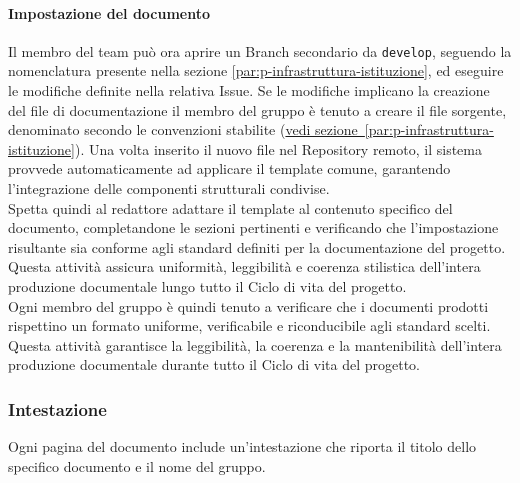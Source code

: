 \documentclass[a4paper,12pt]{article}
\begin{document}
\paragraph{Impostazione del documento}
Il membro del team può ora aprire un Branch secondario da \texttt{develop}, seguendo la nomenclatura presente nella sezione \ref{par:p-infrastruttura-istituzione}, ed eseguire le modifiche definite nella relativa Issue. 
Se le modifiche implicano la creazione del file di documentazione il membro del gruppo è tenuto a creare il file sorgente, denominato secondo le convenzioni stabilite (\hyperref[par:p-infrastruttura-istituzione]{vedi sezione~\ref*{par:p-infrastruttura-istituzione}}). Una volta inserito il nuovo file nel Repository remoto, il sistema provvede automaticamente ad applicare il template comune, garantendo l’integrazione delle componenti strutturali condivise.
\\Spetta quindi al redattore adattare il template al contenuto specifico del documento, completandone le sezioni pertinenti e verificando che l’impostazione risultante sia conforme agli standard definiti per la documentazione del progetto. Questa attività assicura uniformità, leggibilità e coerenza stilistica dell’intera produzione documentale lungo tutto il Ciclo di vita del progetto.
\\Ogni membro del gruppo è quindi tenuto a verificare che i documenti prodotti rispettino un formato uniforme, verificabile e riconducibile agli standard scelti.\\ Questa attività garantisce la leggibilità, la coerenza e la mantenibilità dell’intera produzione documentale durante tutto il Ciclo di vita del progetto.

\subsubsection*{Intestazione}
Ogni pagina del documento include un'intestazione che riporta il titolo dello specifico documento e il nome del gruppo.
\end{document}

